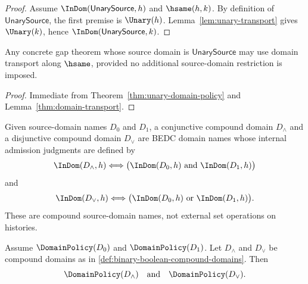 \begin{proof}
Assume \(\InDom(\mathsf{UnarySource},h)\) and \(\hsame(h,k)\). By definition of \(\mathsf{UnarySource}\), the first premise is \(\Unary(h)\). Lemma~\ref{lem:unary-transport} gives \(\Unary(k)\), hence \(\InDom(\mathsf{UnarySource},k)\).
\end{proof}

\begin{corollary}
Any concrete gap theorem whose source domain is \(\mathsf{UnarySource}\) may use domain transport along \(\hsame\), provided no additional source-domain restriction is imposed.
\end{corollary}

\begin{proof}
Immediate from Theorem~\ref{thm:unary-domain-policy} and Lemma~\ref{thm:domain-transport}.
\end{proof}

\begin{definition}
\label{def:binary-boolean-compound-domains}
Given source-domain names $D_0$ and $D_1$, a conjunctive compound domain $D_{\wedge}$ and a disjunctive compound domain $D_{\vee}$ are BEDC domain names whose internal admission judgments are defined by
$$
  \InDom(D_{\wedge},h)
  \Longleftrightarrow
  \bigl(\InDom(D_0,h)\ \text{and}\ \InDom(D_1,h)\bigr)
$$
and
$$
  \InDom(D_{\vee},h)
  \Longleftrightarrow
  \bigl(\InDom(D_0,h)\ \text{or}\ \InDom(D_1,h)\bigr).
$$
These are compound source-domain names, not external set operations on histories.
\end{definition}

\begin{theorem}
\label{thm:domain-policy-binary-boolean-compounds}
Assume $\DomainPolicy(D_0)$ and $\DomainPolicy(D_1)$. Let $D_{\wedge}$ and $D_{\vee}$ be compound domains as in \autoref{def:binary-boolean-compound-domains}. Then
$$
  \DomainPolicy(D_{\wedge})
  \quad\text{and}\quad
  \DomainPolicy(D_{\vee}).
$$
\end{theorem}


